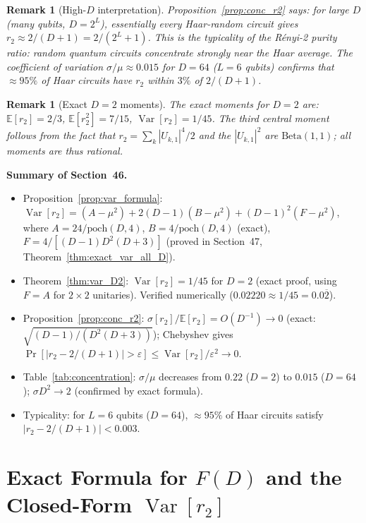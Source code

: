 \documentclass[12pt,a4paper]{article}
\newtheorem{remark}[theorem]{Remark}
\begin{document}
\begin{remark}[High-$D$ interpretation]
Proposition~\ref{prop:conc_r2} says: for large $D$ (many qubits, $D=2^L$),
essentially every Haar-random circuit gives $r_2\approx 2/(D+1)=2/(2^L+1)$.
This is the \emph{typicality} of the Rényi-2 purity ratio:
random quantum circuits concentrate strongly near the Haar average.
The coefficient of variation $\sigma/\mu\approx 0.015$ for $D=64$ ($L=6$ qubits)
confirms that $\approx95\%$ of Haar circuits have $r_2$ within $3\%$ of $2/(D+1)$.
\end{remark}

\begin{remark}[Exact $D=2$ moments]
The exact moments for $D=2$ are:
$\mathbb{E}[r_2]=2/3$, $\mathbb{E}[r_2^2]=7/15$, $\operatorname{Var}[r_2]=1/45$.
The third central moment follows from the fact that $r_2=\sum_k|U_{k,1}|^4/2$
and the $|U_{k,1}|^2$ are $\mathrm{Beta}(1,1)$; all moments are thus rational.
\end{remark}

\bigskip
\noindent\textbf{Summary of Section~46.}
\begin{itemize}
\item Proposition~\ref{prop:var_formula}: $\operatorname{Var}[r_2]=(A-\mu^2)+2(D-1)(B-\mu^2)+(D-1)^2(F-\mu^2)$,
  where $A=24/\mathrm{poch}(D,4)$, $B=4/\mathrm{poch}(D,4)$ (exact),
  $F=4/[(D-1)D^2(D+3)]$ (proved in Section~47, Theorem~\ref{thm:exact_var_all_D}).
\item Theorem~\ref{thm:var_D2}: $\operatorname{Var}[r_2]=1/45$ for $D=2$ (exact proof, using $F=A$ for $2\times2$ unitaries).
  Verified numerically ($0.02220\approx 1/45=0.0\overline{2}$).
\item Proposition~\ref{prop:conc_r2}: $\sigma[r_2]/\mathbb{E}[r_2]=O(D^{-1})\to0$
  (exact: $\sqrt{(D-1)/(D^2(D+3))}$);
  Chebyshev gives $\Pr[|r_2-2/(D+1)|>\varepsilon]\leq\operatorname{Var}[r_2]/\varepsilon^2\to0$.
\item Table~\ref{tab:concentration}: $\sigma/\mu$ decreases from $0.22$ ($D=2$) to $0.015$ ($D=64$);
  $\sigma D^2\to 2$ (confirmed by exact formula).
\item Typicality: for $L=6$ qubits ($D=64$), $\approx95\%$ of Haar circuits satisfy
  $|r_2-2/(D+1)|<0.003$.
\end{itemize}

\section{Exact Formula for $F(D)$ and the Closed-Form $\operatorname{Var}[r_2]$}
\label{sec:exact_var}
\end{document}
